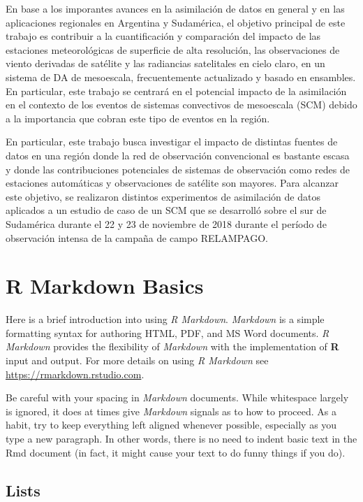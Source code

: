 \documentclass[12pt,twoside]{reedthesis}
\begin{document}
En base a los imporantes avances en la asimilación de datos en general y en las aplicaciones regionales en Argentina y Sudamérica, el objetivo principal de este trabajo es contribuir a la cuantificación y comparación del impacto de las estaciones meteorológicas de superficie de alta resolución, las observaciones de viento derivadas de satélite y las radiancias satelitales en cielo claro, en un sistema de DA de mesoescala, frecuentemente actualizado y basado en ensambles. En particular, este trabajo se centrará en el potencial impacto de la asimilación en el contexto de los eventos de sistemas convectivos de mesoescala (SCM) debido a la importancia que cobran este tipo de eventos en la región.

En particular, este trabajo busca investigar el impacto de distintas fuentes de datos en una región donde la red de observación convencional es bastante escasa y donde las contribuciones potenciales de sistemas de observación como redes de estaciones automáticas y observaciones de satélite son mayores. Para alcanzar este objetivo, se realizaron distintos experimentos de asimilación de datos aplicados a un estudio de caso de un SCM que se desarrolló sobre el sur de Sudamérica durante el 22 y 23 de noviembre de 2018 durante el período de observación intensa de la campaña de campo RELAMPAGO.

\hypertarget{rmd-basics}{%
\chapter{R Markdown Basics}\label{rmd-basics}}

Here is a brief introduction into using \emph{R Markdown}. \emph{Markdown} is a simple formatting syntax for authoring HTML, PDF, and MS Word documents. \emph{R Markdown} provides the flexibility of \emph{Markdown} with the implementation of \textbf{R} input and output. For more details on using \emph{R Markdown} see \url{https://rmarkdown.rstudio.com}.

Be careful with your spacing in \emph{Markdown} documents. While whitespace largely is ignored, it does at times give \emph{Markdown} signals as to how to proceed. As a habit, try to keep everything left aligned whenever possible, especially as you type a new paragraph. In other words, there is no need to indent basic text in the Rmd document (in fact, it might cause your text to do funny things if you do).

\hypertarget{lists}{%
\section{Lists}\label{lists}}
\end{document}
